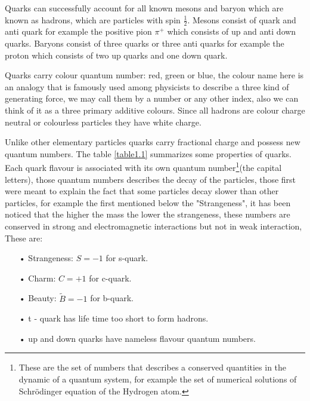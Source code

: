 Quarks can successfully account for all known mesons and baryon which are known as hadrons, which are particles with spin $\frac{1}{2}$. Mesons consist of quark and anti quark for example the positive pion $\pi^+$ which consists of up and anti down quarks. Baryons consist of three quarks or three anti quarks for example the proton which consists of two up quarks and one down quark.


Quarks carry colour quantum number: red, green or blue, the colour name here is an analogy  that is famously used among physicists to describe a three kind of generating force, we may call them by a number or any other index, also we can think of it as a three primary additive colours. Since all hadrons are colour charge neutral or colourless particles they have white charge. 

Unlike other elementary particles quarks carry fractional charge and possess new quantum numbers.
The table \ref{table1.1} summarizes some properties of quarks. Each quark flavour is associated with its own quantum number\footnote{These are the set of numbers that describes a conserved quantities in the dynamic of a quantum system, for example the set of numerical solutions of Schrödinger equation of the Hydrogen atom.}(the capital letters), those quantum numbers describes the decay of the particles, those first were meant to explain the fact that some particles decay slower than other particles, for example the first mentioned below the "Strangeness", it has been noticed that the higher the mass the lower the strangeness,  these numbers are conserved in strong and electromagnetic interactions but not in weak interaction, 
These are: 
\begin{itemize}
\item[•]Strangeness: $S=-1$ for s-quark.

\item[•]Charm: $C=+1$ for c-quark.

\item[•]Beauty: $\tilde{B}=-1$ for b-quark. 

\item[•] t - quark has life time too short to form hadrons. 
\item[•]up and down quarks have nameless flavour quantum numbers.
\end{itemize} \citep{particle}

